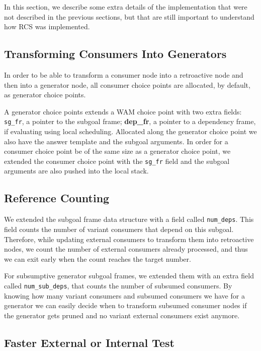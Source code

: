 In this section, we describe some extra details of the implementation that were not described
in the previous sections, but that are still important to understand how RCS was implemented.

\subsection{Transforming Consumers Into Generators}

In order to be able to transform a consumer node into a retroactive node and then into a generator node,
all consumer choice points are allocated, by default, as generator choice points.

A generator choice points extends a WAM choice point with two extra fields:
\texttt{sg\_fr}, a pointer to the subgoal frame; \textbf{dep\_fr}, a pointer to a dependency frame,
if evaluating using local scheduling. Allocated along the generator choice point we also have the answer
template and the subgoal arguments. In order for a consumer choice point be of the same size as a
generator choice point, we extended the consumer choice point with the \texttt{sg\_fr} field and
the subgoal arguments are also pushed into the local stack.

\subsection{Reference Counting}

We extended the subgoal frame data structure with a field called \texttt{num\_deps}. This field
counts the number of variant consumers that depend on this subgoal. Therefore, while updating
external consumers to transform them into retroactive nodes, we count the number of external consumers
already processed, and thus we can exit early when the count reaches the target number.

For subsumptive generator subgoal frames, we extended them with an extra field called \texttt{num\_sub\_deps}, that
counts the number of subsumed consumers. By knowing how many variant consumers and subsumed consumers we
have for a generator we can easily decide when to transform subsumed consumer nodes if the generator gets
pruned and no variant external consumers exist anymore.

\subsection{Faster External or Internal Test}\label{sec:faster_test}

